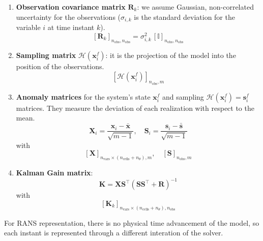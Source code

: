 \begin{enumerate}
  \item \textbf{Observation covariance matrix} $\mathbf{R}_k$: we assume Gaussian, non-correlated uncertainty for the observations ($\sigma_{i,k}$ is the standard deviation for the variable $i$ at time instant $k$).
  \[
  [\mathbf{R}_k]_{n_{\text{obs}}, n_{\text{obs}}} = \sigma_{i,k}^2 \, [\mathbb{I}]_{n_{\text{obs}}, n_{\text{obs}}}
  \]

  \item \textbf{Sampling matrix} $\mathcal{H} \left( \mathbf{x}_i^f \right)$: it is the projection of the model into the position of the observations.
  \[
  \left[ \mathcal{H} \left( \mathbf{x}_i^f \right) \right]_{n_{\text{obs}}, m}
  \]

  \item \textbf{Anomaly matrices} for the system’s state $\mathbf{x}_i^f$ and sampling $\mathcal{H} \left( \mathbf{x}_i^f \right) = \mathbf{s}_i^f$ matrices. They measure the deviation of each realization with respect to the mean.
  \[
  \mathbf{X}_i = \frac{\mathbf{x}_i - \bar{\mathbf{x}}}{\sqrt{m-1}}, \quad 
  \mathbf{S}_i = \frac{\mathbf{s}_i - \bar{\mathbf{s}}}{\sqrt{m-1}}
  \]
  with
  \[
  [\mathbf{X}]_{n_{\text{vars}} \times (n_{\text{cells}} + n_{\theta}), m}, \quad 
  [\mathbf{S}]_{n_{\text{obs}}, m}
  \]

  \item \textbf{Kalman Gain matrix}:
  \[
  \mathbf{K} = \mathbf{X} \mathbf{S}^\top \left( \mathbf{S} \mathbf{S}^\top + \mathbf{R} \right)^{-1}
  \]
  with
  \[
  [\mathbf{K}_k]_{n_{\text{vars}} \times (n_{\text{cells}} + n_{\theta}), n_{\text{obs}}}
  \]
\end{enumerate}







For RANS representation, there is no physical time advancement of the model, so each instant is represented through a different interation of the solver.%

